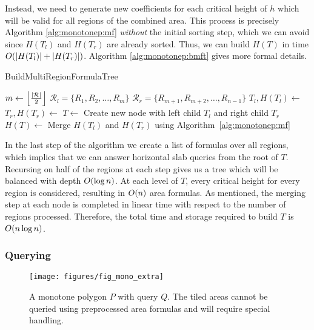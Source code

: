 Instead, we need to generate new coefficients for each critical height of $h$ 
which will be valid for all regions of the combined area.
This process is precisely Algorithm \ref{alg:monotonep:mf} \emph{without} the 
initial sorting step, which we can avoid since $H(T_l)$ and $H(T_r)$ are already 
sorted.
Thus, we can build $H(T)$ in time $O\!\left(|H(T_l)| + |H(T_r)|\right)$.
Algorithm \ref{alg:monotonep:bmft} gives more formal details.

\begin{algorithm}
\LinesNumbered
\DontPrintSemicolon
\caption{BuildMultiRegionFormulaTree}
\label{alg:monotonep:bmft}
\BlankLine
{}
$m \gets \left\lfloor\frac{|\mathcal{R}|}{2}\right\rfloor$\;
$\mathcal{R}_l = \{ R_1, R_2, \ldots, R_m \}$\;
$\mathcal{R}_r = \{ R_{m+1}, R_{m+2}, \ldots, R_{n-1} \}$\;
$T_l, H(T_l) \gets $ \;
$T_r, H(T_r) \gets $ \;
$T \gets $ Create new node with left child $T_l$ and right child $T_r$\;
$H(T) \gets $ Merge $H(T_l)$ and $H(T_r)$ using 
Algorithm~\ref{alg:monotonep:mf}\;
\BlankLine
{}
\end{algorithm}

In the last step of the algorithm we create a list of formulas over all regions, 
which implies that we can answer horizontal slab queries from the root of $T$. 
Recursing on half of the regions at each step gives us a tree which will be 
balanced with depth $O\!\left(\log{n}\right)$. 
At each level of $T$, every critical height for every region is considered, 
resulting in $O\!\left(n\right)$ area formulas.
As mentioned, the merging step at each node is completed in linear time with 
respect to the number of regions processed. 
Therefore, the total time and storage required to build $T$ is 
$O\!\left(n\log{n}\right)$.  


\subsubsection{Querying}
\label{:monotonep:rect:querying}

\begin{figure}[t]
\begin{center}
  \texttt{[image: figures/fig\_mono\_extra]}
  \caption[Details of a query on a monotone polygon.]{A monotone polygon $P$ 
with query $Q$. The tiled areas cannot be queried using preprocessed area 
formulas and will require special handling.}
  \label{fig:monotonep:extra}
\end{center}
\end{figure}

